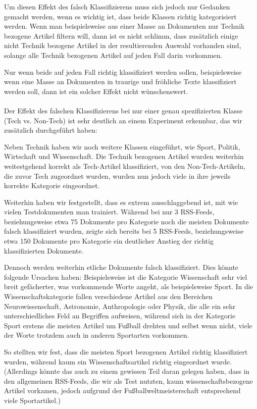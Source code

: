 \documentclass[12pt,a4paper]{scrartcl}
\begin{document}
Um diesen Effekt des falsch Klassifizierens muss sich jedoch nur Gedanken gemacht werden, wenn es wichtig ist, dass beide Klassen richtig kategorisiert werden. Wenn man beispielsweise aus einer Masse an Dokumenten nur Technik bezogene Artikel filtern will, dann ist es nicht schlimm, dass zus\"atzlich einige nicht Technik bezogene Artikel in der resultierenden Auswahl vorhanden sind, solange alle Technik bezogenen Artikel auf jeden Fall darin vorkommen. 

Nur wenn beide auf jeden Fall richtig klassifiziert werden sollen, beispielsweise wenn eine Masse an Dokumenten in traurige und fr\"ohliche Texte klassifiziert werden soll, dann ist ein solcher Effekt nicht w\"unschenswert. 
\\\\
Der Effekt des falschen Klassifizierens bei nur einer genau spezifizierten Klasse (Tech vs. Non-Tech) ist sehr deutlich an einem Experiment erkennbar, das wir zus\"atzlich durchgef\"uhrt haben: 

Neben Technik haben wir noch weitere Klassen eingef\"uhrt, wie Sport, Politik, Wirtschaft und Wissenschaft. Die Technik bezogenen Artikel wurden weiterhin weitestgehend korrekt als Tech-Artikel klassifiziert, von den Non-Tech-Artikeln, die zuvor Tech zugeordnet wurden, wurden nun jedoch viele in ihre jeweils korrekte Kategorie eingeordnet.

Weiterhin haben wir festgestellt, dass es extrem ausschlaggebend ist, mit wie vielen Testdokumenten man trainiert. W\"ahrend bei nur 3 RSS-Feeds, beziehungsweise etwa 75 Dokumente pro Kategorie noch die meisten Dokumente falsch klassifiziert wurden, zeigte sich bereits bei 5 RSS-Feeds, beziehungsweise etwa 150 Dokumente pro Kategorie ein deutlicher Anstieg der richtig klassifizierten Dokumente.

Dennoch werden weiterhin etliche Dokumente falsch klassifiziert. Dies k\"onnte folgende Ursachen haben: Beispielsweise ist die Kategorie Wissenschaft sehr viel breit gef\"acherter, was vorkommende Worte angeht, als beispielsweise Sport. In die Wissenschaftskategorie fallen verschiedene Artikel aus den Bereichen Neurowissenschaft, Astronomie, Anthropologie oder Physik, die alle ein sehr unterschiedliches Feld an Begriffen aufweisen, w\"ahrend sich in der Kategorie Sport erstens die meisten Artikel um Fu\ss ball drehten und selbst wenn nicht, viele der Worte trotzdem auch in anderen Sportarten vorkommen. 

So stellten wir fest, dass die meisten Sport bezogenen Artikel richtig klassifiziert wurden, w\"ahrend kaum ein Wissenschaftsartikel richtig eingeordnet wurde. (Allerdings k\"onnte das auch zu einem gewissen Teil daran gelegen haben, dass in den allgemeinen RSS-Feeds, die wir als Test nutzten, kaum wissenschaftsbezogene Artikel vorkamen, jedoch aufgrund der Fu\ss ballweltmeisterschaft entsprechend viele Sportartikel.)
\end{document}
